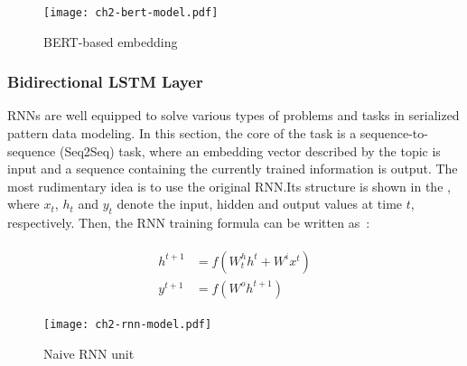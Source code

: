 \begin{figure}[htb]
    \centering
    \texttt{[image: ch2-bert-model.pdf]}
    \caption{BERT-based embedding}\label{fig:ch2-bert-model}
\end{figure}

\subsubsection{Bidirectional LSTM Layer}

RNNs are well equipped to solve various types of problems and tasks in serialized pattern data modeling. In this section, the core of the task is a sequence-to-sequence (Seq2Seq) task, where an embedding vector described by the topic is input and a sequence containing the currently trained information is output. The most rudimentary idea is to use the original RNN.\@ Its structure is shown in the \figname{\ref{fig:ch2-rnn-model}}, where \(x_t\), \(h_t\) and \(y_t\) denote the input, hidden and output values at time \(t\), respectively. Then, the RNN training formula can be written as~\eqname{\ref{fml:rnn-train}}:

\begin{align}\label{fml:rnn-train}
    \begin{split}
        h^{t+1} & =f(W^h_{t} h^t+W^i x^t) \\
        y^{t+1} & =f(W^o h^{t+1})
    \end{split}
\end{align}


\begin{figure}[htbp!]
    \centering
    \texttt{[image: ch2-rnn-model.pdf]}
    \caption{Naive RNN unit}\label{fig:ch2-rnn-model}
\end{figure}


